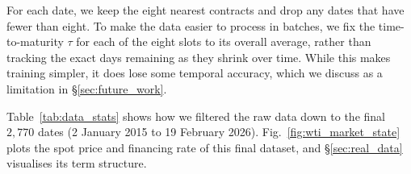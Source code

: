 \documentclass[sigconf, authorversion=true, nonacm=true]{acmart}
\begin{document}
For each date, we keep the eight nearest contracts and drop any dates that have fewer than eight. To make the data easier to process in batches, we fix the time-to-maturity $\tau$ for each of the eight slots to its overall average, rather than tracking the exact days remaining as they shrink over time. While this makes training simpler, it does lose some temporal accuracy, which we discuss as a limitation in \S\ref{sec:future_work}.

Table~\ref{tab:data_stats} shows how we filtered the raw data down to the final $2{,}770$ dates (2 January 2015 to 19 February 2026). Fig.~\ref{fig:wti_market_state} plots the spot price and financing rate of this final dataset, and \S\ref{sec:real_data} visualises its term structure.

\begin{table}[tp]
\centering
\caption{Descriptive statistics for the real WTI futures panel.}
\label{tab:data_stats}
\begin{threeparttable}
\end{threeparttable}
\end{table}
\end{document}
